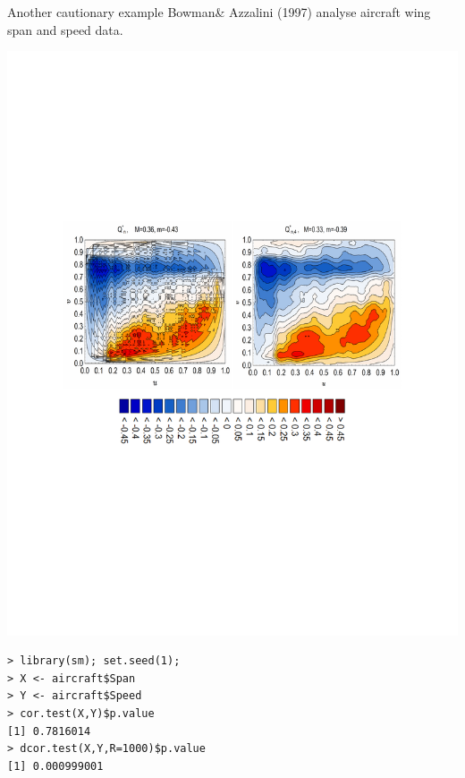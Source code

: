 \documentclass[11pt,handout,aspectratio=169,dvipsnames]{beamer}
\begin{document}
\begin{frame}[fragile]{Another cautionary example}
	Bowman\& Azzalini (1997) analyse aircraft wing span and speed data.	 \begin{center}
	 \includegraphics[scale=.5]{pics/aircraft}	 	
	 \end{center}
	 \begin{lstlisting}
> library(sm); set.seed(1); 
> X <- aircraft$Span
> Y <- aircraft$Speed
> cor.test(X,Y)$p.value
[1] 0.7816014
> dcor.test(X,Y,R=1000)$p.value
[1] 0.000999001
\end{lstlisting}
\end{frame}
\end{document}
